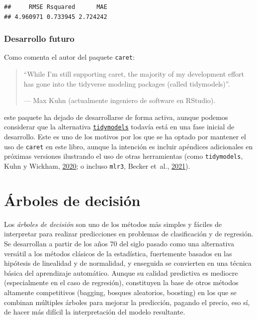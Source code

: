 \documentclass[
  spanish,
]{book}
\theoremstyle{break}
\theoremstyle{definition}
\theoremstyle{definition}
\theoremstyle{definition}
\theoremstyle{remark}
\begin{document}
\begin{verbatim}
##     RMSE Rsquared      MAE 
## 4.960971 0.733945 2.724242
\end{verbatim}

\hypertarget{desarrollo-futuro}{%
\subsection{Desarrollo futuro}\label{desarrollo-futuro}}

Como comenta el autor del paquete \texttt{caret}:

\begin{quote}
``While I'm still supporting caret, the majority of my development effort has gone into the tidyverse modeling packages (called tidymodels)''.

--- Max Kuhn (actualmente ingeniero de software en RStudio).
\end{quote}

este paquete ha dejado de desarrollarse de forma activa, aunque podemos considerar que la alternativa \href{https://www.tidymodels.org}{\texttt{tidymodels}} todavía está en una fase inicial de desarrollo.
Este es uno de los motivos por los que se ha optado por mantener el uso de \texttt{caret} en este libro, aunque la intención es incluir apéndices adicionales en próximas versiones ilustrando el uso de otras herramientas (como \texttt{tidymodels}, Kuhn y Wickham, \protect\hyperlink{ref-kuhn2020tidymodels}{2020}; o incluso \texttt{mlr3}, Becker et~al., \protect\hyperlink{ref-becker2021mlr3}{2021}).

\hypertarget{trees}{%
\chapter{Árboles de decisión}\label{trees}}

Los \emph{árboles de decisión} son uno de los métodos más simples y fáciles de interpretar para realizar predicciones en problemas de clasificación y de regresión.
Se desarrollan a partir de los años 70 del siglo pasado como una alternativa versátil a los métodos clásicos de la estadística, fuertemente basados en las hipótesis de linealidad y de normalidad, y enseguida se convierten en una técnica básica del aprendizaje automático.
Aunque su calidad predictiva es mediocre (especialmente en el caso de regresión), constituyen la base de otros métodos altamente competitivos (bagging, bosques aleatorios, boosting) en los que se combinan múltiples árboles para mejorar la predicción, pagando el precio, eso sí, de hacer más difícil la interpretación del modelo resultante.
\end{document}
